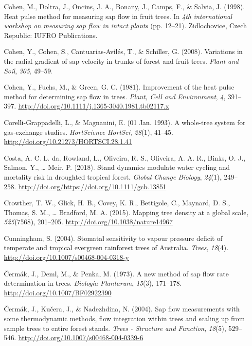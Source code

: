 \documentclass[11pt,twoside]{reedthesis}
\begin{document}
\hypertarget{ref-Cohen1998}{}
Cohen, M., Doltra, J., Oncins, J. A., Bonany, J., Camps, F., \& Salvia,
J. (1998). Heat pulse method for measuring sap flow in fruit trees. In
\emph{4th international workshop on measuring sap flow in intact plants}
(pp. 12--21). Zidlochovice, Czech Republic: IUFRO Publications.

\hypertarget{ref-Cohen2008}{}
Cohen, Y., Cohen, S., Cantuarias-Avilés, T., \& Schiller, G. (2008).
Variations in the radial gradient of sap velocity in trunks of forest
and fruit trees. \emph{Plant and Soil}, \emph{305}, 49--59.

\hypertarget{ref-Cohen1981}{}
Cohen, Y., Fuchs, M., \& Green, G. C. (1981). Improvement of the heat
pulse method for determining sap flow in trees. \emph{Plant, Cell and
Environment}, \emph{4}, 391--397.
\url{http://doi.org/10.1111/j.1365-3040.1981.tb02117.x}

\hypertarget{ref-Corelli1993}{}
Corelli-Grappadelli, L., \& Magnanini, E. (01 Jan. 1993). A whole-tree
system for gas-exchange studies. \emph{HortScience HortSci},
\emph{28}(1), 41--45. \url{http://doi.org/10.21273/HORTSCI.28.1.41}

\hypertarget{ref-daCosta2018}{}
Costa, A. C. L. da, Rowland, L., Oliveira, R. S., Oliveira, A. A. R.,
Binks, O. J., Salmon, Y., \ldots{} Meir, P. (2018). Stand dynamics
modulate water cycling and mortality risk in droughted tropical forest.
\emph{Global Change Biology}, \emph{24}(1), 249--258.
\url{http://doi.org/https://doi.org/10.1111/gcb.13851}

\hypertarget{ref-Crowther2015}{}
Crowther, T. W., Glick, H. B., Covey, K. R., Bettigole, C., Maynard, D.
S., Thomas, S. M., \ldots{} Bradford, M. A. (2015). Mapping tree density
at a global scale, \emph{525}(7568), 201--205.
\url{http://doi.org/10.1038/nature14967}

\hypertarget{ref-cunningham_stomatal_2004}{}
Cunningham, S. (2004). Stomatal sensitivity to vapour pressure deficit
of temperate and tropical evergreen rainforest trees of Australia.
\emph{Trees}, \emph{18}(4).
\url{http://doi.org/10.1007/s00468-004-0318-y}

\hypertarget{ref-cermak1973}{}
Čermák, J., Deml, M., \& Penka, M. (1973). A new method of sap flow rate
determination in trees. \emph{Biologia Plantarum}, \emph{15}(3),
171--178. \url{http://doi.org/10.1007/BF02922390}

\hypertarget{ref-Cermak2004}{}
Čermák, J., Kučera, J., \& Nadezhdina, N. (2004). Sap flow measurements
with some thermodynamic methods, flow integration within trees and
scaling up from sample trees to entire forest stands. \emph{Trees -
Structure and Function}, \emph{18}(5), 529--546.
\url{http://doi.org/10.1007/s00468-004-0339-6}
\end{document}
